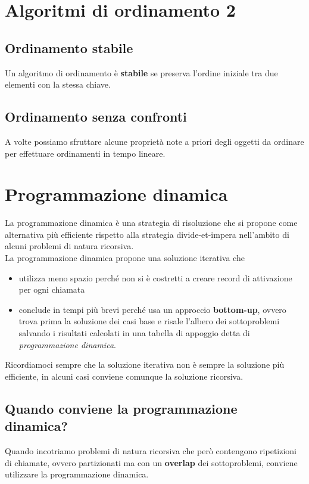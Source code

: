 \documentclass{article}
\begin{document}
\section{Algoritmi di ordinamento 2}
\subsection{Ordinamento stabile}
Un algoritmo di ordinamento è \textbf{stabile} se preserva l'ordine iniziale tra due elementi con la stessa chiave.
\subsection{Ordinamento senza confronti}
A volte possiamo sfruttare alcune proprietà note a priori degli oggetti da ordinare per effettuare ordinamenti in tempo lineare.
\pagebreak

\section{Programmazione dinamica}
La programmazione dinamica è una strategia di risoluzione che si propone come alternativa più efficiente rispetto alla strategia divide-et-impera nell'ambito di alcuni problemi di natura ricorsiva. \\
La programmazione dinamica propone una soluzione iterativa che
\begin{itemize}
  \item utilizza meno spazio perché non si è costretti a creare record di attivazione per ogni chiamata
  \item conclude in tempi più brevi perché usa un approccio \textbf{bottom-up}, ovvero trova prima la soluzione dei casi base e risale l'albero dei sottoproblemi salvando i risultati calcolati in una tabella di appoggio detta di \emph{programmazione dinamica}.
\end{itemize}
Ricordiamoci sempre che la soluzione iterativa non è sempre la soluzione più efficiente, in alcuni casi conviene comunque la soluzione ricorsiva.
\subsection*{Quando conviene la programmazione dinamica?}
Quando incotriamo problemi di natura ricorsiva che però contengono ripetizioni di chiamate, ovvero partizionati ma con un \textbf{overlap} dei sottoproblemi, conviene utilizzare la programmazione dinamica.
\end{document}
